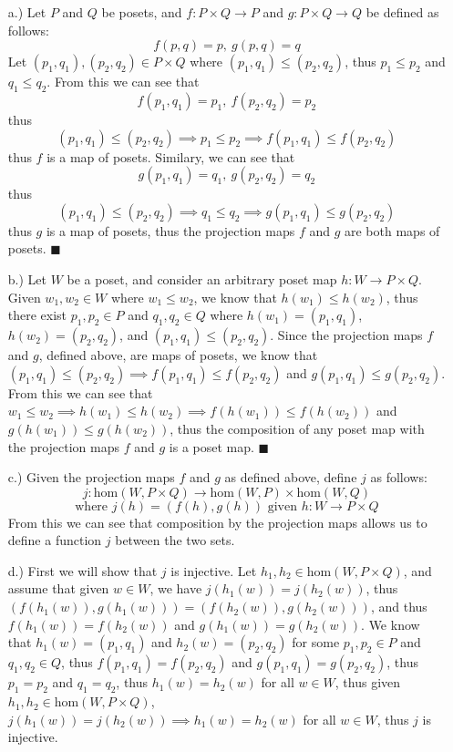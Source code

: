 \documentclass[11pt]{article}
\begin{document}
\pagestyle{fancy}
\fancyhead{}

\normalsize

\begin{itemize}
    \item [a.)] Let $P$ and $Q$ be posets, and $f:P\times Q\to P$ and $g:P\times Q\to Q$ be defined as follows:
    \[f(p,q)=p,\ g(p,q)=q\]
    Let $(p_1,q_1),(p_2,q_2)\in P\times Q$ where $(p_1,q_1)\leq(p_2,q_2)$, thus $p_1\leq p_2$ and $q_1\leq q_2$. From this we can see that
    \[f(p_1,q_1)=p_1,\ f(p_2,q_2)=p_2\]
    thus
    \[(p_1,q_1)\leq (p_2,q_2)\implies p_1\leq p_2\implies f(p_1,q_1)\leq f(p_2,q_2)\]
    thus $f$ is a map of posets. Similary, we can see that
    \[g(p_1,q_1)=q_1,\ g(p_2,q_2)=q_2\]
    thus
    \[(p_1,q_1)\leq (p_2,q_2)\implies q_1\leq q_2\implies g(p_1,q_1)\leq g(p_2,q_2)\]
    thus $g$ is a map of posets, thus the projection maps $f$ and $g$ are both maps of posets. $\blacksquare$
    
    \item [b.)] Let $W$ be a poset, and consider an arbitrary poset map $h:W\to P\times Q$. Given $w_1,w_2\in W$ where $w_1\leq w_2$, we know that $h(w_1)\leq h(w_2)$, thus there exist $p_1,p_2\in P$ and $q_1,q_2\in Q$ where $h(w_1)=(p_1,q_1)$, $h(w_2)=(p_2,q_2)$, and $(p_1,q_1)\leq(p_2,q_2)$. Since the projection maps $f$ and $g$, defined above, are maps of posets, we know that $(p_1,q_1)\leq(p_2,q_2)\implies f(p_1,q_1)\leq f(p_2,q_2)$ and $g(p_1,q_1)\leq g(p_2,q_2)$. From this we can see that $w_1\leq w_2\implies h(w_1)\leq h(w_2)\implies f(h(w_1))\leq f(h(w_2))$ and $g(h(w_1))\leq g(h(w_2))$, thus the composition of any poset map with the projection maps $f$ and $g$ is a poset map. $\blacksquare$

    \item [c.)] Given the projection maps $f$ and $g$ as defined above, define $j$ as follows:
    \[j:\text{hom}(W,P\times Q)\to\text{hom}(W,P)\times\text{hom}(W,Q)\]
    \[\text{where }j(h)=(f(h),g(h))\text{ given }h:W\to P\times Q\]
    From this we can see that composition by the projection maps allows us to define a function $j$ between the two sets.

    \pagebreak
    \item [d.)] First we will show that $j$ is injective. Let $h_1,h_2\in\text{hom}(W,P\times Q)$, and assume that given $w\in W$, we have $j(h_1(w))=j(h_2(w))$, thus $(f(h_1(w)),g(h_1(w)))=(f(h_2(w)),g(h_2(w)))$, and thus $f(h_1(w))=f(h_2(w))$ and $g(h_1(w))=g(h_2(w))$. We know that $h_1(w)=(p_1,q_1)$ and $h_2(w)=(p_2,q_2)$ for some $p_1,p_2\in P$ and $q_1,q_2\in Q$, thus $f(p_1,q_1)=f(p_2,q_2)$ and $g(p_1,q_1)=g(p_2,q_2)$, thus $p_1=p_2$ and $q_1=q_2$, thus $h_1(w)=h_2(w)$ for all $w\in W$, thus given $h_1,h_2\in\text{hom}(W,P\times Q)$, $j(h_1(w))=j(h_2(w))\implies h_1(w)=h_2(w)$ for all $w\in W$, thus $j$ is injective.


\end{itemize}
\end{document}
